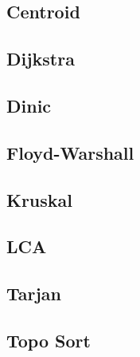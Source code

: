 \documentclass[12pt, a4paper, twoside]{article}
\begin{document}
\newpage

\subsection{Centroid}


\newpage

\subsection{Dijkstra}


\newpage

\subsection{Dinic}


\newpage

\subsection{Floyd-Warshall}


\newpage

\subsection{Kruskal}


\newpage

\subsection{LCA}


\newpage

\subsection{Tarjan}


\newpage

\subsection{Topo Sort}


\newpage

%
%
\end{document}
